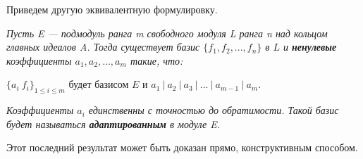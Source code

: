 \noindent Приведем другую эквивалентную формулировку.
\begin{predl}
\hspace*{0.5cm}

\textit{Пусть E — подмодуль ранга m свободного модуля L ранга n над кольцом главных идеалов A. Тогда существует базис $\{f_1, f_2, ..., f_n\}$ в $L$ и \textbf{ненулевые} коэффициенты $a_1, a_2, ..., a_m$ такие, что:}
\begin{center}
$\{a_i~f_i\}_{1 \leqslant i \leqslant m}$ будет базисом $E$ и $a_1~|~a_2~|~a_3~|~...~|~a_{m-1}~|~ a_m$.
\end{center}
\noindent \textit{Коэффициенты $a_i$ единственны с точностью до обратимости. Такой базис будет называться \textbf{адаптированным} в модуле E.}
\end{predl}
Этот последний результат может быть доказан прямо, конструктивным способом.

